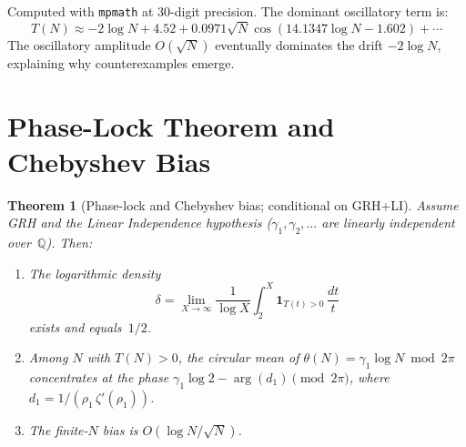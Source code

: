\documentclass[11pt]{article}
\newtheorem{theorem}{Theorem}[section]
\theoremstyle{definition}
\newcommand{\Q}{\mathbb{Q}}
\begin{document}
Computed with \texttt{mpmath} at 30-digit precision.  The dominant
oscillatory term is:
\begin{equation}\label{eq:dominant-osc}
  T(N) \approx -2\log N + 4.52
  + 0.0971\sqrt{N}\cos(14.1347\log N - 1.602) + \cdots
\end{equation}
The oscillatory amplitude $O(\sqrt{N})$ eventually dominates the
drift $-2\log N$, explaining why counterexamples emerge.




\section{Phase-Lock Theorem and Chebyshev Bias}\label{sec:phaselock}

\begin{theorem}[Phase-lock and Chebyshev bias; conditional on GRH+LI]
\label{thm:phase-lock}
Assume GRH and the Linear Independence hypothesis
($\gamma_1, \gamma_2, \ldots$ are linearly independent over~$\Q$).
Then:

\begin{enumerate}[\upshape(a)]
  \item The logarithmic density
  \[
    \delta = \lim_{X \to \infty} \frac{1}{\log X}
    \int_2^X \mathbf{1}_{T(t) > 0}\,\frac{dt}{t}
  \]
  exists and equals~$1/2$.

  \item Among $N$ with $T(N) > 0$, the circular mean of
  $\theta(N) = \gamma_1 \log N \bmod 2\pi$ concentrates at the
  phase $\gamma_1 \log 2 - \arg(d_1) \pmod{2\pi}$, where
  $d_1 = 1/(\rho_1\,\zeta'(\rho_1))$.

  \item The finite-$N$ bias is $O(\log N / \sqrt{N})$.
\end{enumerate}
\end{theorem}
\end{document}
